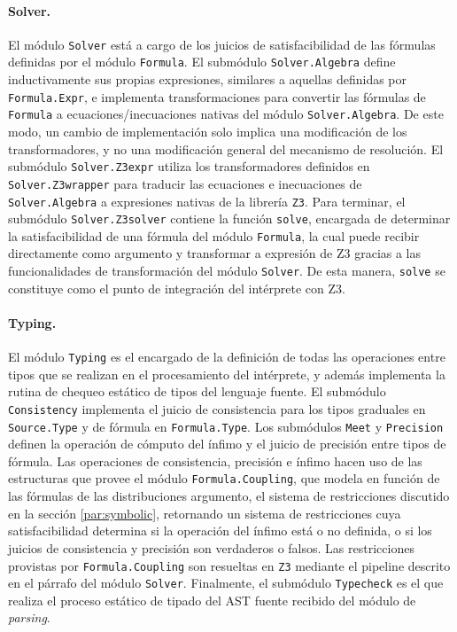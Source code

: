 \paragraph{Solver.} El módulo \verb|Solver| está a cargo de los
juicios de satisfacibilidad de las fórmulas definidas por el módulo
\verb|Formula|. El submódulo \verb|Solver.Algebra| define inductivamente
sus propias expresiones, similares a aquellas definidas por \verb|Formula.Expr|, e implementa transformaciones para convertir las fórmulas de \verb|Formula| a ecuaciones/inecuaciones nativas del módulo \verb|Solver.Algebra|. De este modo, un cambio de implementación solo implica una modificación de los transformadores, y no una modificación general del mecanismo de resolución. El submódulo \verb|Solver.Z3expr| utiliza los transformadores definidos en \verb|Solver.Z3wrapper| para traducir las ecuaciones e inecuaciones de \verb|Solver.Algebra| a expresiones nativas de la librería \verb|Z3|.
Para terminar, el submódulo \verb|Solver.Z3solver| contiene la función \verb|solve|, encargada de determinar la satisfacibilidad de una fórmula del módulo \verb|Formula|, la cual puede recibir directamente como argumento y transformar a expresión de Z3 gracias a las funcionalidades de transformación del módulo \verb|Solver|. De esta manera, \verb|solve| se constituye como el punto de integración del intérprete con Z3.


\paragraph{Typing.} El módulo \verb|Typing| es el encargado de la
definición de todas las operaciones entre tipos que se realizan en el
procesamiento del intérprete, y además implementa la rutina de chequeo
estático de tipos del lenguaje fuente. El submódulo \verb|Consistency|
implementa el juicio de consistencia para los tipos graduales en
\verb|Source.Type| y de fórmula en \verb|Formula.Type|. Los submódulos
\verb|Meet| y \verb|Precision| definen la operación de cómputo del
ínfimo y el juicio de precisión entre tipos de fórmula. Las
operaciones de consistencia, precisión e ínfimo hacen uso de las
estructuras que provee el módulo \verb|Formula.Coupling|, que modela
en función de las fórmulas de las distribuciones argumento, el sistema
de restricciones discutido en la sección \ref{par:symbolic},
retornando un sistema de restricciones cuya satisfacibilidad determina si
la operación del ínfimo está o no definida, o si los juicios de
consistencia y precisión son verdaderos o falsos. Las restricciones
provistas por \verb|Formula.Coupling| son resueltas en \verb|Z3|
mediante el pipeline descrito en el párrafo del módulo
\verb|Solver|. Finalmente, el submódulo \verb|Typecheck| es el que
realiza el proceso estático de tipado del AST fuente recibido del
módulo de \emph{parsing}.

